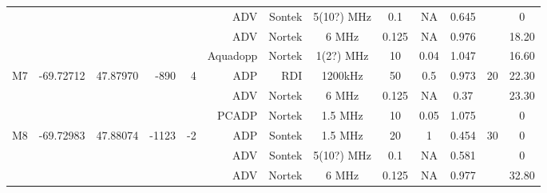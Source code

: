 \documentclass[letterpaper,10pt,landscape]{article}
\begin{document}
\begin{table}
\begin{tabular}{|r|c|c|r|r|r|r|c|c|c|c|c|c|}
    ~                   &                            &                           &                        &                       & ADV          & Sontek     & 5(10?) MHz& 0.1       & NA       & 0.645      &                    &        0          \\ 
    ~                   &                            &                           &                        &                       & ADV          & Nortek     & 6 MHz     & 0.125     & NA       & 0.976      &                    &    18.20          \\ %
    ~                   &                            &                           &                        &                       & Aquadopp     & Nortek     & 1(2?) MHz & 10        & 0.04     & 1.047      &                    &    16.60          \\\hline
    \multirow{3}{*}{M7} & \multirow{3}{*}{-69.72712} & \multirow{3}{*}{47.87970} & \multirow{3}{*}{-890}  & \multirow{3}{*}{4}    & ADP          & RDI        & 1200kHz   & 50        & 0.5      & 0.973      & \multirow{3}{*}{20}&    22.30          \\ 
    ~                   &                            &                           &                        &                       & ADV          & Nortek     & 6 MHz     & 0.125     & NA       & 0.37       &                    &    23.30          \\ %
    ~                   &                            &                           &                        &                       & PCADP        & Nortek     & 1.5 MHz   & 10        & 0.05     & 1.075      &                    &        0          \\\hline
    \multirow{4}{*}{M8} & \multirow{4}{*}{-69.72983} & \multirow{4}{*}{47.88074} & \multirow{4}{*}{-1123} & \multirow{4}{*}{-2}   & ADP          & Sontek     & 1.5 MHz   & 20        & 1        & 0.454      & \multirow{4}{*}{30}&        0          \\ 
    ~                   &                            &                           &                        &                       & ADV          & Sontek     & 5(10?) MHz& 0.1       & NA       & 0.581      &                    &        0          \\ 
    ~                   &                            &                           &                        &                       & ADV          & Nortek     & 6 MHz     & 0.125     & NA       & 0.977      &                    &    32.80          \\ %

\end{tabular}
\end{table}
\end{document}
